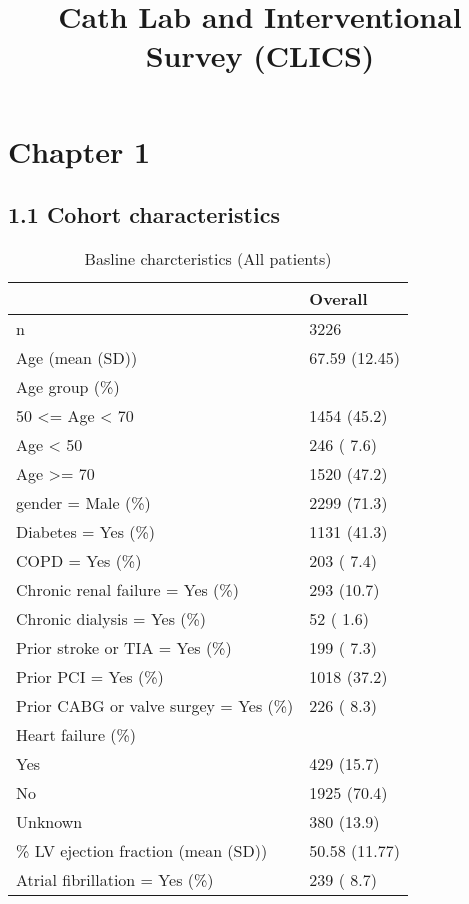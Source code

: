 \documentclass[
]{article}
\title{Cath Lab and Interventional Survey (CLICS)}
\author{}
\date{\vspace{-2.5em}}
\begin{document}
\maketitle

\tableofcontents
\clearpage

\hypertarget{chapter-1}{%
\section{Chapter 1}\label{chapter-1}}

\hypertarget{cohort-characteristics}{%
\subsection{1.1 Cohort characteristics}\label{cohort-characteristics}}

\begin{longtable}[t]{ll}
\caption{\label{tab:table 1}Basline charcteristics (All patients)}\\
\toprule
 & Overall\\
\midrule
n & 3226\\
Age (mean (SD)) & 67.59 (12.45)\\
Age group (\%) & \\
50 <= Age < 70 & 1454 (45.2)\\
Age < 50 & 246 ( 7.6)\\
\addlinespace
Age >= 70 & 1520 (47.2)\\
gender = Male (\%) & 2299 (71.3)\\
Diabetes = Yes (\%) & 1131 (41.3)\\
COPD = Yes (\%) & 203 ( 7.4)\\
Chronic renal failure = Yes (\%) & 293 (10.7)\\
\addlinespace
Chronic dialysis = Yes (\%) & 52 ( 1.6)\\
Prior stroke or TIA = Yes (\%) & 199 ( 7.3)\\
Prior PCI = Yes (\%) & 1018 (37.2)\\
Prior CABG or valve surgey = Yes (\%) & 226 ( 8.3)\\
Heart failure (\%) & \\
\addlinespace
Yes & 429 (15.7)\\
No & 1925 (70.4)\\
Unknown & 380 (13.9)\\
\% LV ejection fraction (mean (SD)) & 50.58 (11.77)\\
Atrial fibrillation = Yes (\%) & 239 ( 8.7)\\
\bottomrule
\end{longtable}
\end{document}
